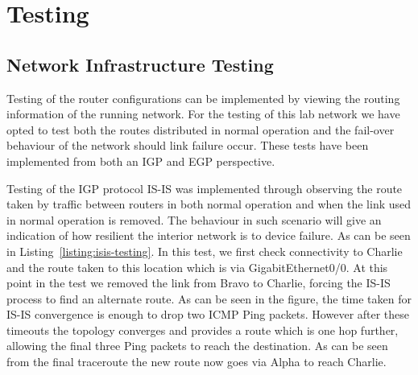 \chapter{Testing}
\section{Network Infrastructure Testing}
Testing of the router configurations can be implemented by viewing the routing information of the running network. For the testing of this lab network we have opted to test both the routes distributed in normal operation and the fail-over behaviour of the network should link failure occur. These tests have been implemented from both an IGP and EGP perspective.

Testing of the IGP protocol IS-IS was implemented through observing the route taken by traffic between routers in both normal operation and when the link used in normal operation is removed. The behaviour in such scenario will give an indication of how resilient the interior network is to device failure. As can be seen in Listing~\ref{listing:isis-testing}. In this test, we first check connectivity to Charlie and the route taken to this location which is via GigabitEthernet0/0. At this point in the test we removed the link from Bravo to Charlie, forcing the IS-IS process to find an alternate route. As can be seen in the figure, the time taken for IS-IS convergence is enough to drop two ICMP Ping packets. However after these timeouts the topology converges and provides a route which is one hop further, allowing the final three Ping packets to reach the destination. As can be seen from the final traceroute the new route now goes via Alpha to reach Charlie.

